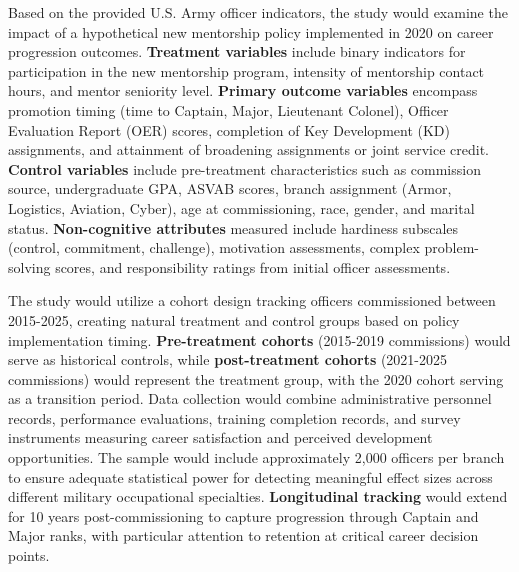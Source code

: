 \documentclass[main.tex]{subfiles}
\begin{document}
Based on the provided U.S. Army officer indicators\parencite{army_indicators}, the study would examine the impact of a hypothetical new mentorship policy implemented in 2020 on career progression outcomes. \textbf{Treatment variables} include binary indicators for participation in the new mentorship program, intensity of mentorship contact hours, and mentor seniority level. \textbf{Primary outcome variables} encompass promotion timing (time to Captain, Major, Lieutenant Colonel), Officer Evaluation Report (OER) scores, completion of Key Development (KD) assignments, and attainment of broadening assignments or joint service credit. \textbf{Control variables} include pre-treatment characteristics such as commission source, undergraduate GPA, ASVAB scores, branch assignment (Armor, Logistics, Aviation, Cyber), age at commissioning, race, gender, and marital status. \textbf{Non-cognitive attributes} measured include hardiness subscales (control, commitment, challenge), motivation assessments, complex problem-solving scores, and responsibility ratings from initial officer assessments\parencite{army_indicators}.


The study would utilize a cohort design tracking officers commissioned between 2015-2025, creating natural treatment and control groups based on policy implementation timing. \textbf{Pre-treatment cohorts} (2015-2019 commissions) would serve as historical controls, while \textbf{post-treatment cohorts} (2021-2025 commissions) would represent the treatment group, with the 2020 cohort serving as a transition period. Data collection would combine administrative personnel records, performance evaluations, training completion records, and survey instruments measuring career satisfaction and perceived development opportunities. The sample would include approximately 2,000 officers per branch to ensure adequate statistical power for detecting meaningful effect sizes across different military occupational specialties. \textbf{Longitudinal tracking} would extend for 10 years post-commissioning to capture progression through Captain and Major ranks, with particular attention to retention at critical career decision points.

\end{document}
